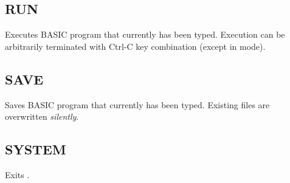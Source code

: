\subsection{RUN}
    \par
    Executes BASIC program that currently has been typed. Execution can be arbitrarily terminated with Ctrl-C key combination (except in  mode).
    
\subsection{SAVE}
    \par
    Saves BASIC program that currently has been typed. Existing files are overwritten \emph{silently}.

\subsection{SYSTEM}
    \par
    Exits \tbas.
